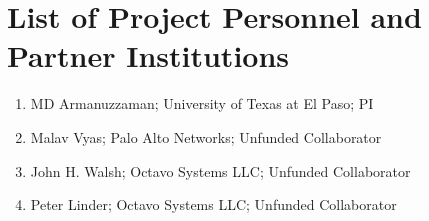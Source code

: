 \documentclass[11pt,onecolumn]{article}
\begin{document}
\section*{List of Project Personnel and Partner Institutions}

\begin{enumerate}[leftmargin=1.8em,itemsep=0.2em]
	\item MD Armanuzzaman; University of Texas at El Paso; PI
	\item Malav Vyas; Palo Alto Networks; Unfunded Collaborator
	\item John H. Walsh; Octavo Systems LLC; Unfunded Collaborator
	\item Peter Linder; Octavo Systems LLC; Unfunded Collaborator
\end{enumerate}
\end{document}
